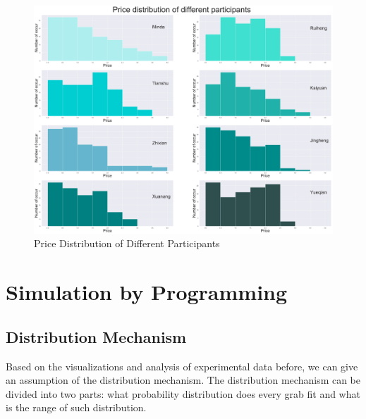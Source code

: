 \documentclass{scrartcl}
\begin{document}
\begin{figure}[H]
	\begin{center}
		\includegraphics[width=16cm]{pic11.pdf}
	\end{center}
	\caption{Price Distribution of Different Participants}
	\label{PriceDistribution_2}
\end{figure}

\section{Simulation by Programming}


\subsection{Distribution Mechanism}\label{sec3.2}
Based on the visualizations and  analysis of experimental data before, we can give an assumption of the distribution mechanism. The distribution mechanism can be divided into two parts: what probability distribution does every grab fit and what is the range of such distribution.
\end{document}
